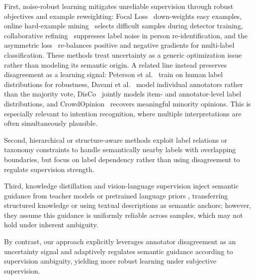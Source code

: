 First, noise-robust learning mitigates unreliable supervision through robust objectives and example reweighting: Focal Loss~\cite{lin_focal_2020} down-weights easy examples, online hard-example mining~\cite{shrivastava_training_2016} selects difficult samples during detector training, collaborative refining~\cite{ye_collaborative_2022} suppresses label noise in person re-identification, and the asymmetric loss~\cite{ridnik_asymmetric_2021} re-balances positive and negative gradients for multi-label classification. These methods treat uncertainty as a generic optimization issue rather than modeling its semantic origin. A related line instead preserves disagreement as a learning signal: Peterson et al.~\cite{peterson_human_2019} train on human label distributions for robustness, Davani et al.~\cite{mostafazadeh_davani_dealing_2022} model individual annotators rather than the majority vote, DisCo~\cite{weerasooriya_disagreement_2023} jointly models item- and annotator-level label distributions, and CrowdOpinion~\cite{weerasooriya_subjective_2023} recovers meaningful minority opinions. This is especially relevant to intention recognition, where multiple interpretations are often simultaneously plausible.

Second, hierarchical or structure-aware methods exploit label relations or taxonomy constraints \cite{zhang_use_2022, shi_learnable_2023} to handle semantically nearby labels with overlapping boundaries, but focus on label dependency rather than using disagreement to regulate supervision strength.

Third, knowledge distillation and vision-language supervision inject semantic guidance from teacher models or pretrained language priors \cite{touvron_training_2021, radford_learning_2021}, transferring structured knowledge or using textual descriptions as semantic anchors; however, they assume this guidance is uniformly reliable across samples, which may not hold under inherent ambiguity.

By contrast, our approach explicitly leverages annotator disagreement as an uncertainty signal and adaptively regulates semantic guidance according to supervision ambiguity, yielding more robust learning under subjective supervision.
\fi
